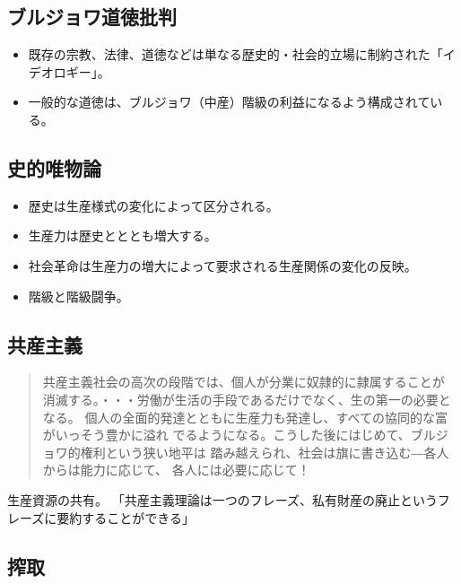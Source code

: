 \documentclass[uplatex,dvipdfmx]{jsarticle} \usepackage{mystyle}%
\begin{document}
\subsection{ブルジョワ道徳批判}

\begin{itemize}
\item 既存の宗教、法律、道徳などは単なる歴史的・社会的立場に制約された「イデオロギー」。
\item 一般的な道徳は、ブルジョワ（中産）階級の利益になるよう構成されている。
\end{itemize}


\subsection{史的唯物論}

\begin{itemize}
\item 歴史は生産様式の変化によって区分される。
\item 生産力は歴史とととも増大する。
\item 社会革命は生産力の増大によって要求される生産関係の変化の反映。
\item 階級と階級闘争。
\end{itemize}




\subsection{共産主義}

\begin{quote}
  共産主義社会の高次の段階では、個人が分業に奴隷的に隷属することが
消滅する。・・・労働が生活の手段であるだけでなく、生の第一の必要となる。
個人の全面的発達とともに生産力も発達し、すべての協同的な富がいっそう豊かに溢れ
でるようになる。こうした後にはじめて、ブルジョワ的権利という狭い地平は
踏み越えられ、社会は旗に書き込む{\――}各人からは能力に応じて、
各人には必要に応じて！
\end{quote}


生産資源の共有。
「共産主義理論は一つのフレーズ、私有財産の廃止というフレーズに要約することができる」



\subsection{搾取}
\end{document}
